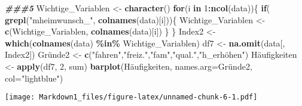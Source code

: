 \documentclass[
]{article}
\newenvironment{Shaded}{\begin{snugshade}}{\end{snugshade}}
\newcommand{\AttributeTok}[1]{\textcolor[rgb]{0.13,0.29,0.53}{#1}}
\newcommand{\ControlFlowTok}[1]{\textcolor[rgb]{0.13,0.29,0.53}{\textbf{#1}}}
\newcommand{\DecValTok}[1]{\textcolor[rgb]{0.00,0.00,0.81}{#1}}
\newcommand{\DocumentationTok}[1]{\textcolor[rgb]{0.56,0.35,0.01}{\textbf{\textit{#1}}}}
\newcommand{\FunctionTok}[1]{\textcolor[rgb]{0.13,0.29,0.53}{\textbf{#1}}}
\newcommand{\NormalTok}[1]{#1}
\newcommand{\OtherTok}[1]{\textcolor[rgb]{0.56,0.35,0.01}{#1}}
\newcommand{\SpecialCharTok}[1]{\textcolor[rgb]{0.81,0.36,0.00}{\textbf{#1}}}
\newcommand{\StringTok}[1]{\textcolor[rgb]{0.31,0.60,0.02}{#1}}
\begin{document}
\begin{Shaded}
\begin{Highlighting}[]
\DocumentationTok{\#\#\#5}
\NormalTok{Wichtige\_Variablen }\OtherTok{\textless{}{-}} \FunctionTok{character}\NormalTok{()}
\ControlFlowTok{for}\NormalTok{(i }\ControlFlowTok{in} \DecValTok{1}\SpecialCharTok{:}\FunctionTok{ncol}\NormalTok{(data))\{}
  \ControlFlowTok{if}\NormalTok{( }\FunctionTok{grepl}\NormalTok{(}\StringTok{"mheimwunsch\_"}\NormalTok{, }\FunctionTok{colnames}\NormalTok{(data)[i]))\{}
\NormalTok{    Wichtige\_Variablen }\OtherTok{\textless{}{-}} \FunctionTok{c}\NormalTok{(Wichtige\_Variablen, }\FunctionTok{colnames}\NormalTok{(data)[i])}
\NormalTok{  \}}
\NormalTok{\}}
\NormalTok{Index2 }\OtherTok{\textless{}{-}} \FunctionTok{which}\NormalTok{(}\FunctionTok{colnames}\NormalTok{(data) }\SpecialCharTok{\%in\%}\NormalTok{ Wichtige\_Variablen)}
\NormalTok{df7 }\OtherTok{\textless{}{-}} \FunctionTok{na.omit}\NormalTok{(data[, Index2])}
\NormalTok{Gründe2 }\OtherTok{\textless{}{-}} \FunctionTok{c}\NormalTok{(}\StringTok{"fahren"}\NormalTok{,}\StringTok{"freiz."}\NormalTok{,}\StringTok{"fam"}\NormalTok{,}\StringTok{"qual."}\NormalTok{,}\StringTok{"h\_erhöhen"}\NormalTok{)}
\NormalTok{Häufigkeiten }\OtherTok{\textless{}{-}} \FunctionTok{apply}\NormalTok{(df7, }\DecValTok{2}\NormalTok{, sum)}
\FunctionTok{barplot}\NormalTok{(Häufigkeiten, }\AttributeTok{names.arg=}\NormalTok{Gründe2,}
        \AttributeTok{col=}\StringTok{"lightblue"}\NormalTok{)}
\end{Highlighting}
\end{Shaded}

\texttt{[image: Markdown1\_files/figure-latex/unnamed-chunk-6-1.pdf]}
\end{document}
